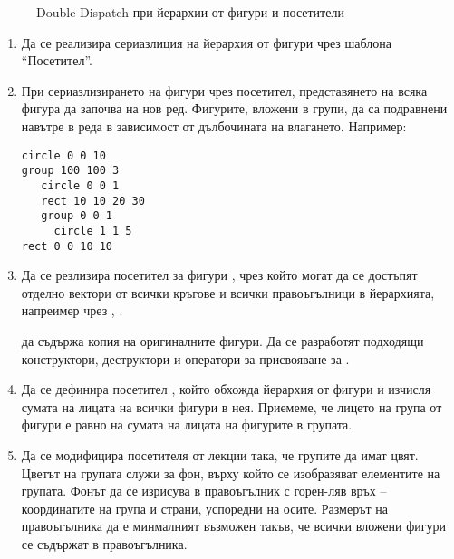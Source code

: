 \begin{figure}
  
  \caption{Double Dispatch при йерархии от фигури и посетители}
  \label{fig:visitor}
  \end{figure}  


\begin{enumerate}[resume]
  \item Да се реализира сериазлиция на йерархия от фигури чрез шаблона ``Посетител''.
  \item При сериазлизирането на фигури чрез посетител, представянето на всяка фигура да започва на нов ред. Фигурите, вложени в групи, да са подравнени навътре в реда в зависимост от дълбочината на влагането. Например:
\begin{verbatim}
circle 0 0 10
group 100 100 3
   circle 0 0 1
   rect 10 10 20 30
   group 0 0 1
     circle 1 1 5
rect 0 0 10 10 
\end{verbatim}
  \item Да се резлизира посетител за фигури , чрез който могат да се достъпят отделно вектори от всички кръгове и всички правоъгълници в йерархията, напреимер чрез , .
  
   да съдържа копия на оригиналните фигури. Да се разработят подходящи конструктори, деструктори и оператори за присвояване за .
  \item Да се дефинира посетител , който обхожда йерархия от фигури и изчисля сумата на лицата на всички фигури в нея. Приемеме, че лицето на група от фигури е равно на сумата на лицата на фигурите в групата.
  \item Да се модифицира посетителя  от лекции така, че групите да имат цвят. Цветът на групата служи за фон, върху който се изобразяват елементите на групата. Фонът да се изрисува в правоъгълник с горен-ляв връх -- координатите на група и страни, успоредни на осите. Размерът на правоъгълника да е минмалният възможен такъв, че всички вложени фигури се съдържат в правоъгълника. 
  
\end{enumerate}


